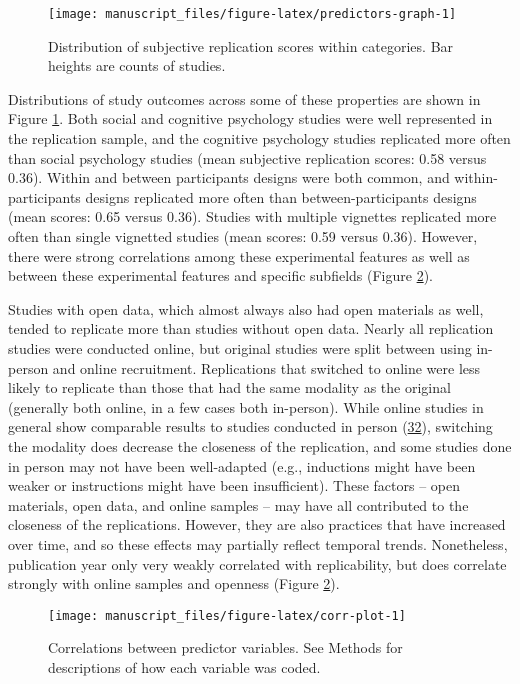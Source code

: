 \documentclass[
  english,
  a4paper,
]{article}
\begin{document}
\begin{figure}[ht]
\texttt{[image: manuscript\_files/figure-latex/predictors-graph-1]} \caption{Distribution of subjective replication scores within categories. Bar heights are counts of studies.}\label{fig:predictors-graph}
\end{figure}

Distributions of study outcomes across some of these properties are shown in Figure \ref{fig:predictors-graph}. Both social and cognitive psychology studies were well represented in the replication sample, and the cognitive psychology studies replicated more often than social psychology studies (mean subjective replication scores: 0.58 versus 0.36). Within and between participants designs were both common, and within-participants designs replicated more often than between-participants designs (mean scores: 0.65 versus 0.36). Studies with multiple vignettes replicated more often than single vignetted studies (mean scores: 0.59 versus 0.36). However, there were strong correlations among these experimental features as well as between these experimental features and specific subfields (Figure \ref{fig:corr-plot}).

Studies with open data, which almost always also had open materials as well, tended to replicate more than studies without open data. Nearly all replication studies were conducted online, but original studies were split between using in-person and online recruitment. Replications that switched to online were less likely to replicate than those that had the same modality as the original (generally both online, in a few cases both in-person). While online studies in general show comparable results to studies conducted in person (\protect\hyperlink{ref-crump2013}{32}), switching the modality does decrease the closeness of the replication, and some studies done in person may not have been well-adapted (e.g., inductions might have been weaker or instructions might have been insufficient). These factors -- open materials, open data, and online samples -- may have all contributed to the closeness of the replications. However, they are also practices that have increased over time, and so these effects may partially reflect temporal trends. Nonetheless, publication year only very weakly correlated with replicability, but does correlate strongly with online samples and openness (Figure \ref{fig:corr-plot}).

\begin{figure}[ht]
\texttt{[image: manuscript\_files/figure-latex/corr-plot-1]} \caption{Correlations between predictor variables. See Methods for descriptions of how each variable was coded. }\label{fig:corr-plot}
\end{figure}
\end{document}

